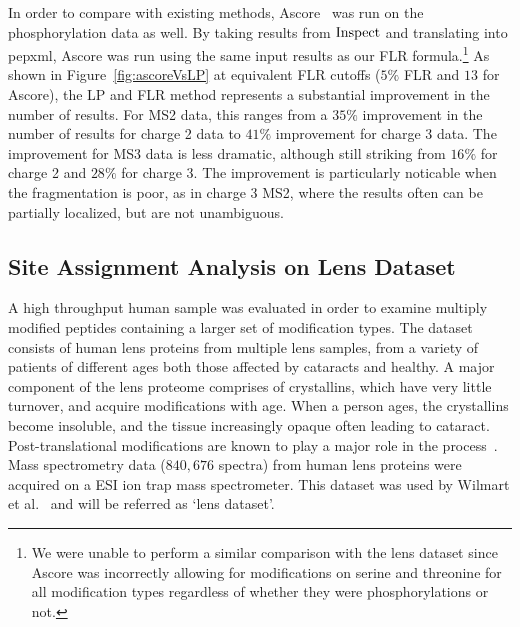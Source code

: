 \documentclass[11pt]{article}
\newcommand{\inspect}{${\rm Inspect}$}
\begin{document}
{In order to compare with existing methods, Ascore~\cite{beausoleil06} was run on the phosphorylation data as well. By taking results from {\inspect} and translating into pepxml, Ascore was run using the same input results as our FLR formula.\footnote{We were unable to perform a similar comparison with the lens dataset since Ascore was incorrectly allowing for modifications on serine and threonine for all modification types regardless of whether they were phosphorylations or not.} As shown in  Figure~\ref{fig:ascoreVsLP} at equivalent FLR cutoffs ($5\%$ FLR and $13$ for Ascore), the LP and FLR method represents a substantial improvement in the number of results. For MS2 data, this ranges from a $35\%$ improvement in the number of results for charge 2 data to $41\%$ improvement for charge 3 data. The improvement for MS3 data is less dramatic, although still striking from $16\%$ for charge 2 and $28\%$ for charge 3. The improvement is particularly noticable when the fragmentation is poor, as in charge 3 MS2, where the results often can be partially localized, but are not unambiguous. 



\subsection{Site Assignment Analysis on Lens Dataset}\label{sec:lensdataset}
A high throughput human sample was evaluated in order to examine multiply modified peptides containing a larger set of modification types. The dataset consists of human lens proteins from multiple lens samples, from a variety of patients of different ages both those affected by cataracts and healthy. A major component of the lens proteome comprises of crystallins, which have very little turnover, and acquire modifications with age. When a person ages, the crystallins become insoluble, and the tissue increasingly opaque often leading to cataract. Post-translational modifications are known to play a major role in the process~\cite{tsur05}. Mass spectrometry data ($840,676$ spectra) from human lens proteins were acquired on a ESI ion trap mass spectrometer. This dataset was used by Wilmart et al.~\cite{Wilmarth06} and will be referred as `lens dataset'.


}
\end{document}
